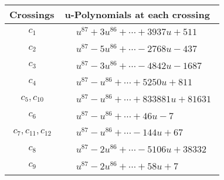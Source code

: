 \documentclass[1p]{elsarticle_modified}
\theoremstyle{definition}
\begin{document}
\begin{tabular}{m{50pt}|m{274pt}}
Crossings & \hspace{64pt}u-Polynomials at each crossing \\
\hline $$\begin{aligned}c_{1}\end{aligned}$$&$\begin{aligned}
&u^{87}+3 u^{86}+\cdots+3937 u+511
\end{aligned}$\\
\hline $$\begin{aligned}c_{2}\end{aligned}$$&$\begin{aligned}
&u^{87}-5 u^{86}+\cdots-2768 u-437
\end{aligned}$\\
\hline $$\begin{aligned}c_{3}\end{aligned}$$&$\begin{aligned}
&u^{87}-3 u^{86}+\cdots-4842 u-1687
\end{aligned}$\\
\hline $$\begin{aligned}c_{4}\end{aligned}$$&$\begin{aligned}
&u^{87}- u^{86}+\cdots+5250 u+811
\end{aligned}$\\
\hline $$\begin{aligned}c_{5},c_{10}\end{aligned}$$&$\begin{aligned}
&u^{87}- u^{86}+\cdots+833881 u+81631
\end{aligned}$\\
\hline $$\begin{aligned}c_{6}\end{aligned}$$&$\begin{aligned}
&u^{87}- u^{86}+\cdots+46 u-7
\end{aligned}$\\
\hline $$\begin{aligned}c_{7},c_{11},c_{12}\end{aligned}$$&$\begin{aligned}
&u^{87}- u^{86}+\cdots-144 u+67
\end{aligned}$\\
\hline $$\begin{aligned}c_{8}\end{aligned}$$&$\begin{aligned}
&u^{87}-2 u^{86}+\cdots-5106 u+38332
\end{aligned}$\\
\hline $$\begin{aligned}c_{9}\end{aligned}$$&$\begin{aligned}
&u^{87}-2 u^{86}+\cdots+58 u+7
\end{aligned}$\\
\hline
\end{tabular}\\~\\
\end{document}
